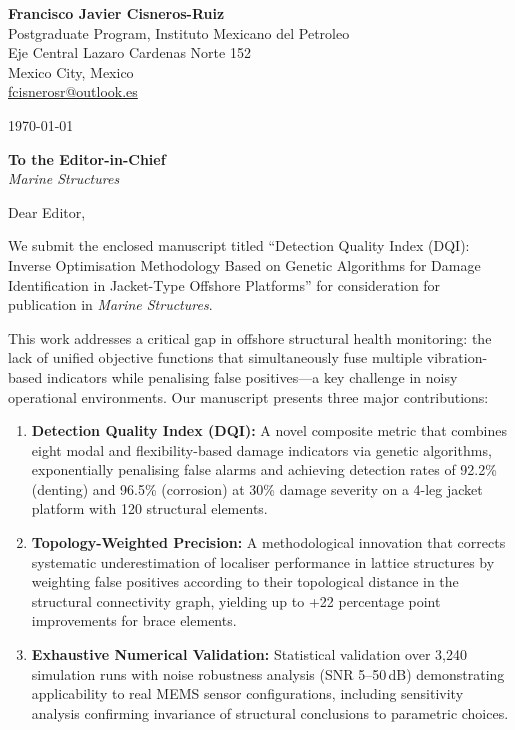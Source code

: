 \documentclass[11pt]{article}
\begin{document}
\noindent
\textbf{Francisco Javier Cisneros-Ruiz} \\
Postgraduate Program, Instituto Mexicano del Petroleo \\
Eje Central Lazaro Cardenas Norte 152 \\
Mexico City, Mexico \\
\href{mailto:fcisnerosr@outlook.es}{fcisnerosr@outlook.es} \\
\vspace{0.5cm}

\today

\vspace{0.5cm}

\noindent
\textbf{To the Editor-in-Chief} \\
\textit{Marine Structures}

\vspace{0.5cm}

Dear Editor,

\vspace{0.3cm}

We submit the enclosed manuscript titled ``Detection Quality Index (DQI): Inverse Optimisation Methodology Based on Genetic Algorithms for Damage Identification in Jacket-Type Offshore Platforms'' for consideration for publication in \textit{Marine Structures}.

This work addresses a critical gap in offshore structural health monitoring: the lack of unified objective functions that simultaneously fuse multiple vibration-based indicators while penalising false positives—a key challenge in noisy operational environments. Our manuscript presents three major contributions:

\begin{enumerate}
    \item \textbf{Detection Quality Index (DQI):} A novel composite metric that combines eight modal and flexibility-based damage indicators via genetic algorithms, exponentially penalising false alarms and achieving detection rates of 92.2\% (denting) and 96.5\% (corrosion) at 30\% damage severity on a 4-leg jacket platform with 120 structural elements.

    \item \textbf{Topology-Weighted Precision:} A methodological innovation that corrects systematic underestimation of localiser performance in lattice structures by weighting false positives according to their topological distance in the structural connectivity graph, yielding up to +22 percentage point improvements for brace elements.

    \item \textbf{Exhaustive Numerical Validation:} Statistical validation over 3{,}240 simulation runs with noise robustness analysis (SNR 5--50\,dB) demonstrating applicability to real MEMS sensor configurations, including sensitivity analysis confirming invariance of structural conclusions to parametric choices.
\end{enumerate}
\end{document}
